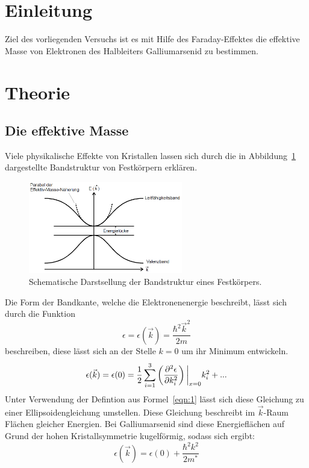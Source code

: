 \section{Einleitung}
Ziel des vorliegenden Versuchs ist es mit Hilfe des Faraday-Effektes die effektive
Masse von Elektronen des Halbleiters Galliumarsenid zu bestimmen.
\section{Theorie}
\subsection{Die effektive Masse}
Viele physikalische Effekte von Kristallen lassen sich durch die in Abbildung~\ref{fig:band}
dargestellte Bandstruktur von Festkörpern erklären.
\begin{figure}
  \centering
  \includegraphics[width=0.6\textwidth]{graphics/band.png}
  \caption{Schematische Darstsellung der Bandstruktur eines Festkörpers\cite{anleitung}.}
  \label{fig:band}
\end{figure}
Die Form der Bandkante, welche die Elektronenenergie beschreibt, lässt sich durch die Funktion
\begin{equation}
  \epsilon = \epsilon(\vec{k}) = \frac{\hbar^2\vec{k}^2}{2m}
  \label{eqn:1}
\end{equation}
beschreiben, diese lässt sich an der Stelle $k=0$ um ihr Minimum entwickeln.
\begin{equation}
  \epsilon(\vec{k}) = \epsilon(0) = \frac{1}{2}\sum_{i=1}^3 \left(\frac{\partial^2 \epsilon}{\partial k_i^2}\right)\bigg{\vert}_{x=0} k_i^2 + ...
\end{equation}
Unter Verwendung der Defintion aus Formel~\ref{eqn:1} lässt sich diese Gleichung zu einer Ellipsoidengleichung umstellen. Diese Gleichung beschreibt
im $\vec{k}$-Raum Flächen gleicher Energien. Bei Galliumarsenid sind diese Energieflächen auf Grund der hohen Kristallsymmetrie kugelförmig, sodass
sich ergibt:
\begin{equation}
  \epsilon(\vec{k}) = \epsilon(0) + \frac{\hbar^2k^2}{2m^{*}}
\end{equation}
